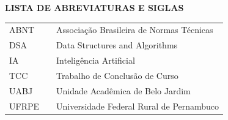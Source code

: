 
\begin{center}
    \textbf{LISTA DE ABREVIATURAS E SIGLAS}
    \vspace{1cm}
\end{center}

\begin{table}[h]
    \begin{tabular}{lcl}
        ABNT & \hspace{0.5cm} & Associação Brasileira de Normas Técnicas \\
        DSA & \hspace{0.5cm} & Data Structures and Algorithms \\
        IA & \hspace{0.5cm} & Inteligência Artificial \\
        TCC & \hspace{0.5cm} & Trabalho de Conclusão de Curso \\
        UABJ & \hspace{0.5cm} & Unidade Acadêmica de Belo Jardim \\
        UFRPE & \hspace{0.5cm} & Universidade Federal Rural de Pernambuco
    \end{tabular}
\end{table}

